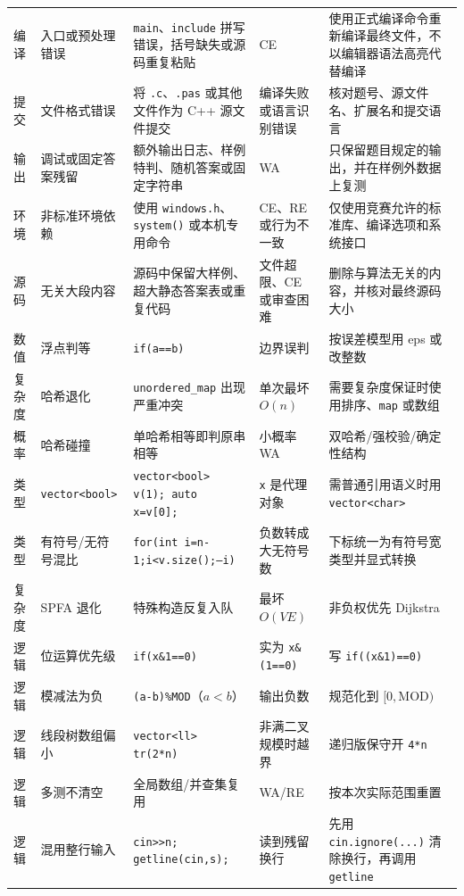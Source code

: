 \documentclass[a4paper,11pt]{article}
\newcommand{\code}[1]{\texttt{#1}}
\begin{document}
\begin{longtable}{L{1.1cm} L{2.5cm} L{4.3cm} L{2.8cm} L{4.8cm}}
编译 & 入口或预处理错误 & \code{main}、\code{include} 拼写错误，括号缺失或源码重复粘贴 & CE & 使用正式编译命令重新编译最终文件，不以编辑器语法高亮代替编译\\[2mm]
提交 & 文件格式错误 & 将 \code{.c}、\code{.pas} 或其他文件作为 C++ 源文件提交 & 编译失败或语言识别错误 & 核对题号、源文件名、扩展名和提交语言\\[2mm]
输出 & 调试或固定答案残留 & 额外输出日志、样例特判、随机答案或固定字符串 & WA & 只保留题目规定的输出，并在样例外数据上复测\\[2mm]
环境 & 非标准环境依赖 & 使用 \code{windows.h}、\code{system()} 或本机专用命令 & CE、RE 或行为不一致 & 仅使用竞赛允许的标准库、编译选项和系统接口\\[2mm]
源码 & 无关大段内容 & 源码中保留大样例、超大静态答案表或重复代码 & 文件超限、CE 或审查困难 & 删除与算法无关的内容，并核对最终源码大小\\[2mm]
数值 & 浮点判等 & \code{if(a==b)} & 边界误判 & 按误差模型用 eps 或改整数\\[2mm]
复杂度 & 哈希退化 & \code{unordered\_map} 出现严重冲突 & 单次最坏 $O(n)$ & 需要复杂度保证时使用排序、\code{map} 或数组\\[2mm]
概率 & 哈希碰撞 & 单哈希相等即判原串相等 & 小概率 WA & 双哈希/强校验/确定性结构\\[2mm]
类型 & \code{vector<bool>} & \code{vector<bool> v(1); auto x=v[0];} & \code{x} 是代理对象 & 需普通引用语义时用 \code{vector<char>}\\[2mm]
类型 & 有符号/无符号混比 & \code{for(int i=n-1;i<v.size();--i)} & 负数转成大无符号数 & 下标统一为有符号宽类型并显式转换\\[2mm]
复杂度 & SPFA 退化 & 特殊构造反复入队 & 最坏 $O(VE)$ & 非负权优先 Dijkstra\\[2mm]
逻辑 & 位运算优先级 & \code{if(x\&1==0)} & 实为 \code{x\&(1==0)} & 写 \code{if((x\&1)==0)}\\[2mm]
逻辑 & 模减法为负 & \code{(a-b)\%MOD}（$a<b$） & 输出负数 & 规范化到 $[0,\mathrm{MOD})$\\[2mm]
逻辑 & 线段树数组偏小 & \code{vector<ll> tr(2*n)} & 非满二叉规模时越界 & 递归版保守开 \code{4*n}\\[2mm]
逻辑 & 多测不清空 & 全局数组/并查集复用 & WA/RE & 按本次实际范围重置\\[2mm]
逻辑 & 混用整行输入 & \code{cin>>n; getline(cin,s);} & 读到残留换行 & 先用 \code{cin.ignore(...)} 清除换行，再调用 \code{getline}\\
\end{longtable}
\endgroup
\end{document}
